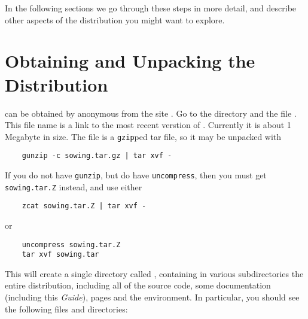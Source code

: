 \documentclass[11pt,twoside]{article}
\begin{document}
In the following
sections we go through these steps in more detail, and describe other aspects
of the  distribution you might want to explore.

\section{Obtaining and Unpacking the Distribution}
\label{sec:unpacking}

 can be obtained by anonymous  from the site
.  Go to the directory  and 
the file .  This file name is a link to the most recent
verstion of .  Currently it is about 1 Megabyte in size.  The
file is a {\tt gzip}ped tar file, so it may be unpacked with
\begin{verbatim}
    gunzip -c sowing.tar.gz | tar xvf -
\end{verbatim}
If you do not have {\tt gunzip}, but do have {\tt uncompress}, then you must
get {\tt sowing.tar.Z} instead, and use either 
\begin{verbatim}
    zcat sowing.tar.Z | tar xvf -
\end{verbatim}
or 
\begin{verbatim}
    uncompress sowing.tar.Z
    tar xvf sowing.tar
\end{verbatim}
This will create a single directory called , containing in various
subdirectories the entire distribution, including all of the source code, some
documentation (including this {\em Guide}),  pages and the
 environment.%
In particular, you should see the following files and directories:
\end{document}
